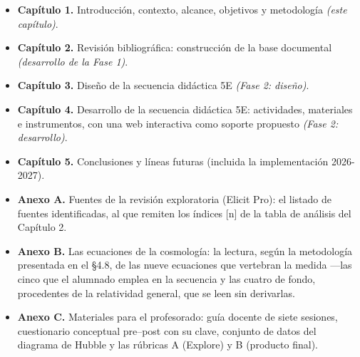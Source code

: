 \begin{itemize}
\item \textbf{Capítulo 1.} Introducción, contexto, alcance, objetivos y metodología \textit{(este capítulo)}.
\item \textbf{Capítulo 2.} Revisión bibliográfica: construcción de la base documental \textit{(desarrollo de la Fase 1)}.
\item \textbf{Capítulo 3.} Diseño de la secuencia didáctica 5E \textit{(Fase 2: diseño)}.
\item \textbf{Capítulo 4.} Desarrollo de la secuencia didáctica 5E: actividades, materiales e instrumentos, con una web interactiva como soporte propuesto \textit{(Fase 2: desarrollo)}.
\item \textbf{Capítulo 5.} Conclusiones y líneas futuras (incluida la implementación 2026-2027).
\item \textbf{Anexo A.} Fuentes de la revisión exploratoria (Elicit Pro): el listado de fuentes identificadas, al que remiten los índices [n] de la tabla de análisis del Capítulo 2.
\item \textbf{Anexo B.} Las ecuaciones de la cosmología: la lectura, según la metodología presentada en el §4.8, de las nueve ecuaciones que vertebran la medida ---las cinco que el alumnado emplea en la secuencia y las cuatro de fondo, procedentes de la relatividad general, que se leen sin derivarlas.
\item \textbf{Anexo C.} Materiales para el profesorado: guía docente de siete sesiones, cuestionario conceptual pre--post con su clave, conjunto de datos del diagrama de Hubble y las rúbricas A (Explore) y B (producto final).
\end{itemize}
